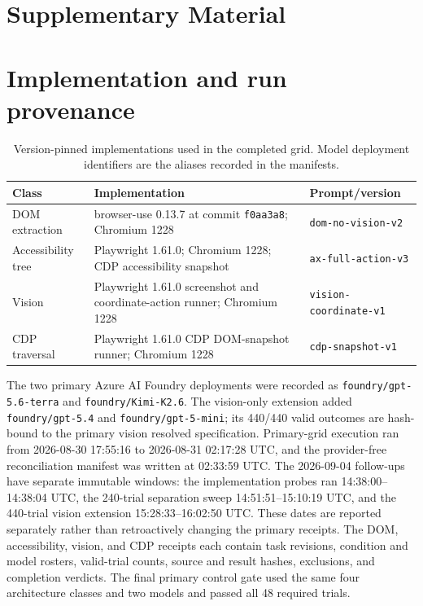 \documentclass{article}
\begin{document}
\clearpage



\clearpage
\appendix
\section*{Supplementary Material}

\section{Implementation and run provenance}
\label{app:implementations}

\begin{table}[h]
  \caption{Version-pinned implementations used in the completed grid. Model deployment identifiers are the aliases recorded in the manifests.}
  \label{tab:implementations}
  \centering
  \small
  \begin{tabularx}{\linewidth}{lXl}
    \toprule
    Class & Implementation & Prompt/version \\
    \midrule
    DOM extraction & browser-use 0.13.7 at commit \texttt{f0aa3a8}; Chromium 1228 & \texttt{dom-no-vision-v2} \\
    Accessibility tree & Playwright 1.61.0; Chromium 1228; CDP accessibility snapshot & \texttt{ax-full-action-v3} \\
    Vision & Playwright 1.61.0 screenshot and coordinate-action runner; Chromium 1228 & \texttt{vision-coordinate-v1} \\
    CDP traversal & Playwright 1.61.0 CDP DOM-snapshot runner; Chromium 1228 & \texttt{cdp-snapshot-v1} \\
    \bottomrule
  \end{tabularx}
\end{table}

The two primary Azure AI Foundry deployments were recorded as \texttt{foundry/gpt-5.6-terra} and \texttt{foundry/Kimi-K2.6}. The vision-only extension added \texttt{foundry/gpt-5.4} and \texttt{foundry/gpt-5-mini}; its 440/440 valid outcomes are hash-bound to the primary vision resolved specification. Primary-grid execution ran from 2026-08-30 17:55:16 to 2026-08-31 02:17:28 UTC, and the provider-free reconciliation manifest was written at 02:33:59 UTC. The 2026-09-04 follow-ups have separate immutable windows: the implementation probes ran 14:38:00--14:38:04 UTC, the 240-trial separation sweep 14:51:51--15:10:19 UTC, and the 440-trial vision extension 15:28:33--16:02:50 UTC. These dates are reported separately rather than retroactively changing the primary receipts. The DOM, accessibility, vision, and CDP receipts each contain task revisions, condition and model rosters, valid-trial counts, source and result hashes, exclusions, and completion verdicts. The final primary control gate used the same four architecture classes and two models and passed all 48 required trials.
\end{document}
